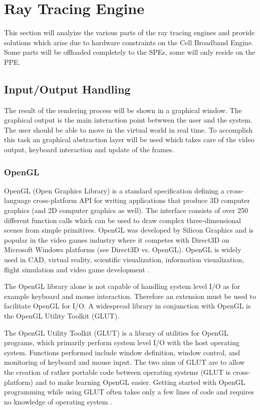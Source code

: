 \documentclass[DIV10, abstracton, openright, footsepline, headsepline, twoside, 9pt,
bigheadings]{scrreprt}
\begin{document}
\newpage
\section{Ray Tracing Engine}

This section will analyize the various parts of the ray tracing engines and provide
solutions which arise due to hardware constraints on the Cell Broadband Engine.
Some parts will be offloaded completely to the SPEs, some will only reside on
the PPE.
\subsection{Input/Output Handling}
The result of the rendering process will be shown in a graphical window. The graphical
output is the main interaction point betwwen the user and the system. The user should
be able to move in the virtual world in real time. To accomplish this task an graphical
abstraction layer will be used which takes care of the video output, keyboard
interaction and update of the frames.

\subsubsection*{OpenGL}
OpenGL (Open Graphics Library) is a standard specification defining a cross-language
 cross-platform API for writing applications that produce 3D computer graphics (and 2D
computer graphics as well). The interface consists of over 250 different function calls
 which can be used to draw complex three-dimensional scenes from simple primitives.
OpenGL was developed by Silicon Graphics and is popular in the video games industry
where it competes with Direct3D on Microsoft Windows platforms (see Direct3D vs.
OpenGL). OpenGL is widely used in CAD, virtual reality, scientific visualization,
information visualization, flight simulation and video game development \cite{opengl06}.

The OpenGL library alone is not capable of handling system level I/O as for example
keyboard and mouse interaction. Therefore an extension must be used to facilitate
OpenGL for I/O. A widespread library in conjunction with OpenGL is the OpenGL
Utility Toolkit (GLUT).

The OpenGL Utility Toolkit (GLUT) is a library of utilities for OpenGL programs,
 which primarily perform system level I/O with the host operating system. Functions
performed include window definition, window control, and monitoring of keyboard and
mouse input.  The two aims of GLUT are to allow the creation of rather portable code
 between operating systems (GLUT is cross-platform) and to make learning OpenGL easier.
Getting started with OpenGL programming while using GLUT often takes only a few lines
of code and requires no knowledge of operating system \cite{glut06}.
\end{document}
